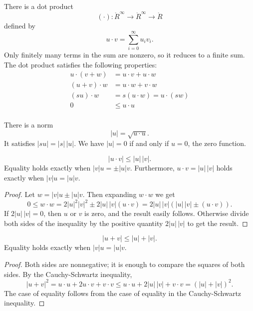 
There is a dot product
$$(\cdot):\ring{R}^\infty\to\ring{R}^\infty\to\ring{R}$$ defined by
    $$u\cdot v = \sum_{i=0}^\infty u_i v_i.$$
Only finitely many terms in the sum are nonzero, so it reduces to a
finite sum.  The dot product satisfies the following
properties:
    $$\begin{array}{lll}
        u \cdot (v + w) &= u \cdot v + u \cdot w\\
        (u + v)\cdot w &= u \cdot w + v \cdot w\\
        (s u)\cdot w &= s(u \cdot w) = u \cdot (s w)\\
        0 &\le u\cdot u\\
    \end{array}$$


There is a norm
$$|u| = \sqrt{u\cdot u}.$$
It satisfies $| s u | = |s| \, |u|$.  We have $|u|=0$  if and
only if $u=0$, the zero function.

\begin{lemma}
    $$|u \cdot v| \le |u|\,|v|.$$
Equality holds exactly when $|v|u = \pm |u|v$.  Furthermore,
$u\cdot v = |u|\,|v|$ holds exactly when $|v| u = |u| v$.
\end{lemma}

\begin{proof}
   Let $w = |v| u \pm |u| v$.  Then expanding $w\cdot w$ we get
    $$0\le w\cdot w = 2|u|^2|v|^2 \pm 2|u|\, |v| (u\cdot v) =
    2|u|\,
    |v| (|u|\, |v| \pm (u \cdot v)).$$
    If $2|u| \,|v| = 0$, then $u$ or $v$ is zero, and the result
    easily follows.  Otherwise divide both sides of the inequality
    by the positive quantity $2 |u| \,|v|$ to get the result.
\end{proof}

\begin{lemma}
  $$
  |u + v| \le |u| + |v |.
  $$
Equality holds exactly when $|v|u = |u|v$.
\end{lemma}

\begin{proof}
Both sides are nonnegative; it is enough to compare the squares of
both sides.  By the Cauchy-Schwartz inequality,
    $$|u + v|^2 = u\cdot u + 2 u\cdot v + v\cdot v \le
      u\cdot u + 2 | u|\,|v| + v\cdot v = (|u|+|v|)^2.
    $$
The case of equality follows from the case of equality in the
Cauchy-Schwartz inequality.
\end{proof}

